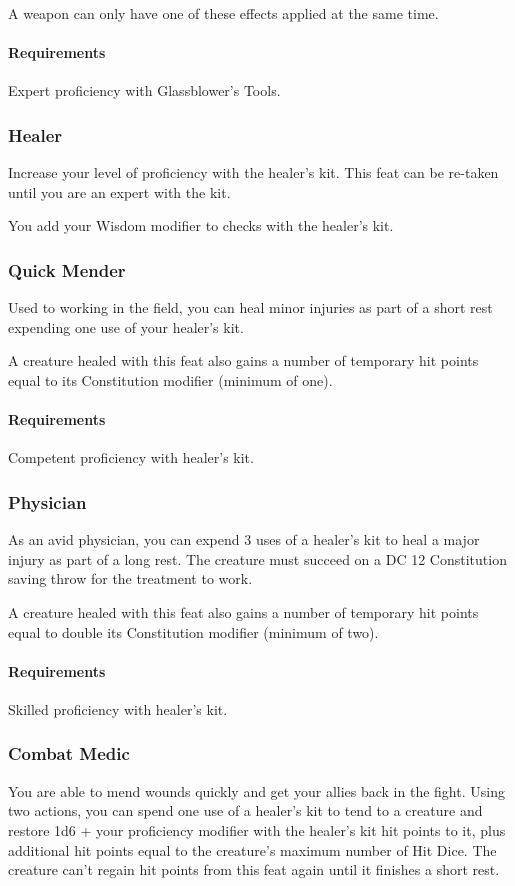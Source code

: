     A weapon can only have one of these effects applied at the same time.
    \paragraph{Requirements} Expert proficiency with Glassblower's Tools.

\subsubsection{Healer} \label{feat::healer}
    Increase your level of proficiency with the healer's kit.
    This feat can be re-taken until you are an expert with the kit.

    You add your Wisdom modifier to checks with the healer's kit.
\subsubsection{Quick Mender} \label{feat::quickmender}
    Used to working in the field, you can heal minor injuries as part of a short rest expending one use of your healer's kit.

    A creature healed with this feat also gains a number of temporary hit points equal to its Constitution modifier (minimum of one).
    \paragraph{Requirements} Competent proficiency with healer's kit.
\subsubsection{Physician} \label{feat::physician}
    As an avid physician, you can expend 3 uses of a healer's kit to heal a major injury as part of a long rest.
    The creature must succeed on a DC 12 Constitution saving throw for the treatment to work.

    A creature healed with this feat also gains a number of temporary hit points equal to double its Constitution modifier (minimum of two).
    \paragraph{Requirements} Skilled proficiency with healer's kit.
\subsubsection{Combat Medic} \label{feat::combatmedic}
    You are able to mend wounds quickly and get your allies back in the fight.
    Using two actions, you can spend one use of a healer's kit to tend to a creature and restore 1d6 + your proficiency modifier with the healer's kit hit points to it, plus additional hit points equal to the creature's maximum number of Hit Dice.
    The creature can't regain hit points from this feat again until it finishes a short rest.

